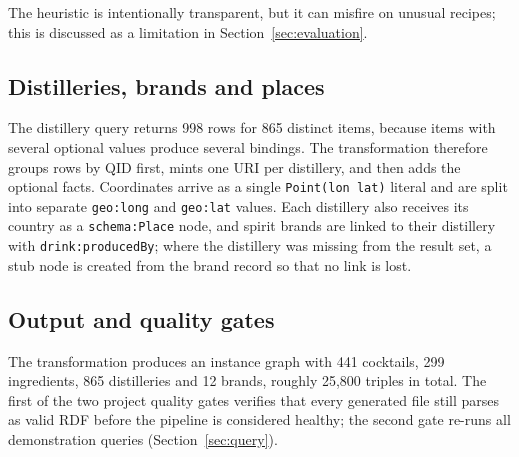 The heuristic is intentionally transparent, but it can misfire on unusual
recipes; this is discussed as a limitation in Section~\ref{sec:evaluation}.

\subsection{Distilleries, brands and places}

The distillery query returns 998 rows for 865 distinct items, because items
with several optional values produce several bindings. The transformation
therefore groups rows by QID first, mints one URI per distillery, and then adds
the optional facts. Coordinates arrive as a single \texttt{Point(lon lat)}
literal and are split into separate \texttt{geo:long} and \texttt{geo:lat}
values. Each distillery also receives its country as a \texttt{schema:Place}
node, and spirit brands are linked to their distillery with
\texttt{drink:producedBy}; where the distillery was missing from the result
set, a stub node is created from the brand record so that no link is lost.

\subsection{Output and quality gates}

The transformation produces an instance graph with 441 cocktails, 299
ingredients, 865 distilleries and 12 brands, roughly 25{,}800 triples in total.
The first of the two project quality gates verifies that every generated file
still parses as valid RDF before the pipeline is considered healthy; the second
gate re-runs all demonstration queries (Section~\ref{sec:query}).
